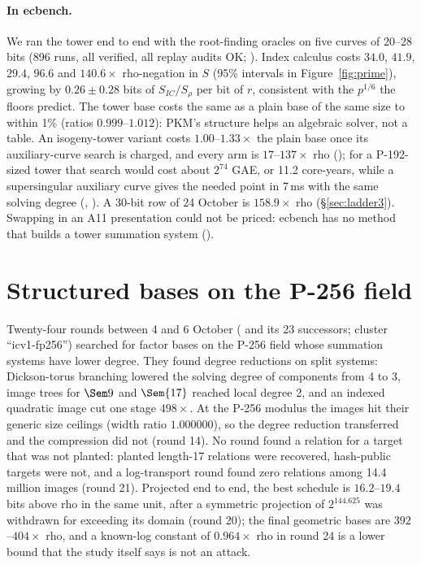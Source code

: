 \paragraph{In ecbench.} We ran the tower end to end with the root-finding
oracles on five curves of 20--28 bits (896 runs, all verified, all replay
audits OK; ). Index calculus
costs $34.0$, $41.9$, $29.4$, $96.6$ and $140.6\times$ rho-negation in $S$
(95\% intervals in Figure~\ref{fig:prime}), growing by $0.26\pm0.28$ bits of
$S_{IC}/S_\rho$ per bit of $r$, consistent with the $p^{1/6}$ the floors
predict. The tower base costs the same as a plain base of the same size to
within 1\% (ratios $0.999$--$1.012$): PKM's structure helps an algebraic
solver, not a table. An isogeny-tower variant costs $1.00$--$1.33\times$ the
plain base once its auxiliary-curve search is charged, and every arm is
$17$--$137\times$ rho ();
for a P-192-sized tower that search would cost about $2^{74}$ GAE, or
11.2 core-years, while a supersingular auxiliary curve gives the needed point
in 7\,ms with the same solving degree
(,
). A 30-bit row of 24 October
is $158.9\times$ rho (\S\ref{sec:ladder3}). Swapping in an A11 presentation
could not be priced: ecbench has no method that builds a tower summation
system ().

\section{Structured bases on the P-256 field}

Twenty-four rounds between 4 and 6 October
(
and its 23 successors; cluster ``icv1-fp256'') searched for factor bases on
the P-256 field whose summation systems have lower degree. They found
degree reductions on split systems: Dickson-torus branching lowered the
solving degree of components from 4 to 3, image trees for $\Sem9$ and
$\Sem{17}$ reached local degree 2, and an indexed quadratic image cut one
stage $498\times$. At the P-256 modulus the images hit their generic size
ceilings (width ratio $1.000000$), so the degree reduction transferred and
the compression did not (round 14). No round found a relation for a
target that was not planted: planted length-17 relations were recovered,
hash-public targets were not, and a log-transport round found zero
relations among 14.4 million images (round 21). Projected end to end, the
best schedule is $16.2$--$19.4$ bits above rho in the same unit, after a
symmetric projection of $2^{144.625}$ was withdrawn for exceeding its domain
(round 20); the final geometric bases are $392$--$404\times$ rho, and a
known-log constant of $0.964\times$ rho in round 24 is a lower bound that the
study itself says is not an attack.

